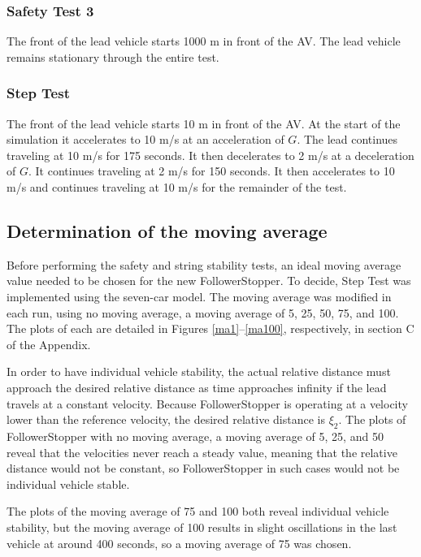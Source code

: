 \documentclass[conference]{IEEEtran}
\begin{document}
\subsubsection{Safety Test 3}
The front of the lead vehicle starts 1000 m in front of the AV. The lead vehicle remains stationary through the entire test.
\subsubsection{Step Test}
The front of the lead vehicle starts 10 m in front of the AV. At the start of the simulation it accelerates to 10 m/s at an acceleration of $G$. The lead continues traveling at 10 m/s for 175 seconds. It then decelerates to 2 m/s at a deceleration of $G$. It continues traveling at 2 m/s for 150 seconds. It then accelerates to 10 m/s and continues traveling at 10 m/s for the remainder of the test.

\subsection{Determination of the moving average}
Before performing the safety and string stability tests, an ideal moving average value needed to be chosen for the new FollowerStopper. To decide, Step Test was implemented using the seven-car model. The moving average was modified in each run, using no moving average, a moving average of 5, 25, 50, 75, and 100. The plots of each are detailed in Figures \ref{ma1}--\ref{ma100}, respectively, in section C of the Appendix.

In order to have individual vehicle stability, the actual relative distance must approach the desired relative distance as time approaches infinity if the lead travels at a constant velocity. Because FollowerStopper is operating at a velocity lower than the reference velocity, the desired relative distance is $\xi_2$. The plots of FollowerStopper with no moving average, a moving average of 5, 25, and 50 reveal that the velocities never reach a steady value, meaning that the relative distance would not be constant, so FollowerStopper in such cases would not be individual vehicle stable.

The plots of the moving average of 75 and 100 both reveal individual vehicle stability, but the moving average of 100 results in slight oscillations in the last vehicle at around 400 seconds, so a moving average of 75 was chosen.
\end{document}
